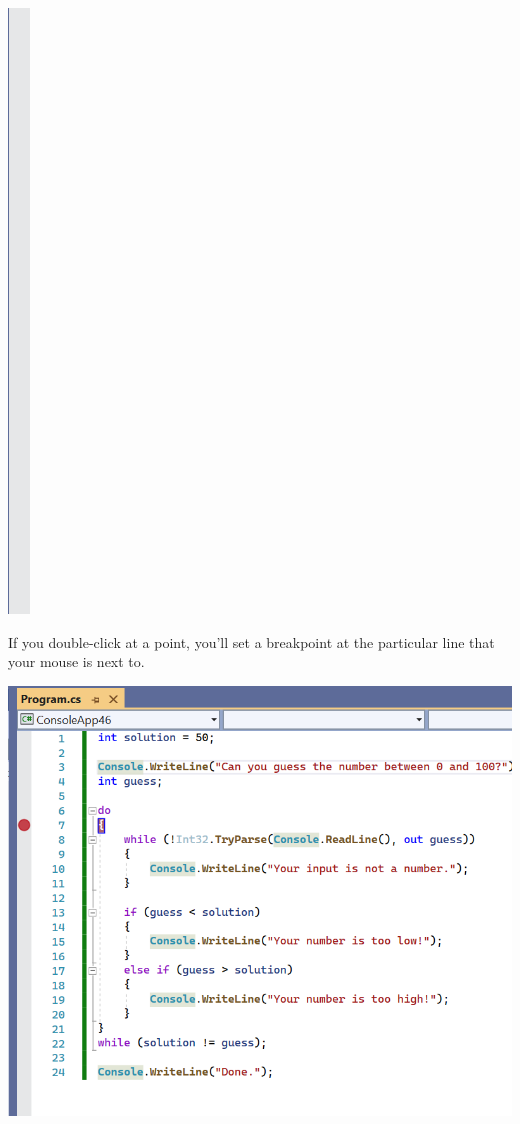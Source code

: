 \documentclass[oneside, openany] {book}
\begin{document}
\includegraphics[scale=0.2]{breakpointline}

If you double-click at a point, you'll set a breakpoint at the particular line that your mouse is next to.

\includegraphics[scale=0.40]{breakpointset}
\end{document}
